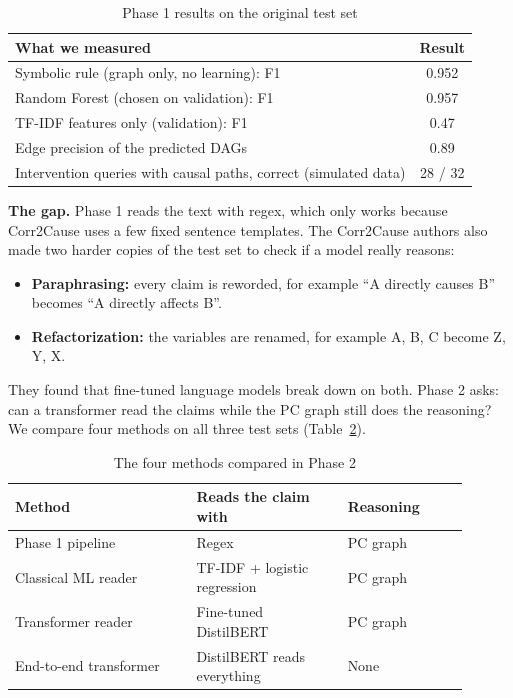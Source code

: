 \documentclass[conference]{IEEEtran}
\begin{document}
\begin{table}[t]
\centering
\caption{Phase 1 results on the original test set}
\label{tab:phase1}
\begin{tabular}{lc}
\toprule
What we measured & Result \\
\midrule
Symbolic rule (graph only, no learning): F1 & 0.952 \\
Random Forest (chosen on validation): F1 & 0.957 \\
TF-IDF features only (validation): F1 & 0.47 \\
Edge precision of the predicted DAGs & 0.89 \\
Intervention queries with causal paths, correct (simulated data) & 28 / 32 \\
\bottomrule
\end{tabular}
\end{table}

\textbf{The gap.} Phase 1 reads the text with regex, which only works because Corr2Cause uses a few fixed sentence
templates. The Corr2Cause authors also made two harder copies of the test set to check if a model really reasons:
\begin{itemize}
\item \textbf{Paraphrasing:} every claim is reworded, for example ``A directly causes B'' becomes ``A directly
affects B''.
\item \textbf{Refactorization:} the variables are renamed, for example A, B, C become Z, Y, X.
\end{itemize}
They found that fine-tuned language models break down on both. Phase 2 asks: can a transformer read the claims
while the PC graph still does the reasoning? We compare four methods on all three test sets
(Table~\ref{tab:methods}).

\begin{table}[t]
\centering
\caption{The four methods compared in Phase 2}
\label{tab:methods}
\footnotesize
\setlength{\tabcolsep}{3pt}
\begin{tabular}{p{0.36\linewidth}p{0.30\linewidth}p{0.24\linewidth}}
\toprule
Method & Reads the claim with & Reasoning \\
\midrule
Phase 1 pipeline & Regex & PC graph \\
Classical ML reader & TF-IDF + logistic regression & PC graph \\
Transformer reader & Fine-tuned DistilBERT & PC graph \\
End-to-end transformer & DistilBERT reads everything & None \\
\bottomrule
\end{tabular}
\end{table}
\end{document}
